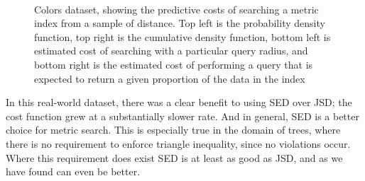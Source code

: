 \begin{figure}
         
        ~ 
\caption[Metric Search Cost -- Colors dataset]{Colors dataset, showing the predictive costs of searching a metric index from a sample of distance.  Top left is the probability density function, top right is the cumulative density function, bottom left is estimated cost of searching with a particular query radius, and bottom right is the estimated cost of performing a query that is expected to return a given proportion of the data in the index}
\end{figure}

In this real-world dataset, there was a clear benefit to using SED over JSD; the cost function grew at a substantially slower rate.  And in general, SED is a better choice for metric search.  This is especially true in the domain of trees, where there is no requirement to enforce triangle inequality, since no violations occur.  Where this requirement does exist SED is at least as good as JSD, and as we have found can even be better.

